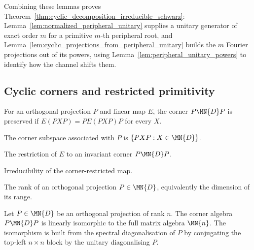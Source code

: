 Combining these lemmas proves Theorem~\ref{thm:cyclic_decomposition_irreducible_schwarz}:
Lemma~\ref{lem:normalized_peripheral_unitary} supplies a unitary generator of
exact order $m$ for a primitive $m$-th peripheral root, and
Lemma~\ref{lem:cyclic_projections_from_peripheral_unitary} builds the $m$
Fourier projections out of its powers, using
Lemma~\ref{lem:peripheral_unitary_powers} to identify how the channel shifts
them.

\subsection{Cyclic corners and restricted primitivity}

\begin{definition}
    \leanok
    For an orthogonal projection $P$ and linear map $E$, the corner
    $P\MN{D}P$ is preserved if $E(PXP)=PE(PXP)P$ for every $X$.
\end{definition}

\begin{definition}
    \leanok
    The corner subspace associated with $P$ is
    $\{PXP:X\in\MN{D}\}$.
\end{definition}

\begin{definition}
    \label{def:corner_restriction}
    \leanok
    The restriction of $E$ to an invariant corner $P\MN{D}P$.
\end{definition}

\begin{definition}
    \leanok
    Irreducibility of the corner-restricted map.
\end{definition}

\begin{definition}
    \leanok
    The rank of an orthogonal projection $P\in\MN{D}$, equivalently the
    dimension of its range.
\end{definition}

\begin{lemma}%
    \label{thm:compression_isometry_projection}
    \leanok
    Let $P\in\MN{D}$ be an orthogonal projection of rank $n$. The corner
    algebra $P\MN{D}P$ is linearly isomorphic to the full matrix algebra
    $\MN{n}$. The isomorphism is built from the spectral diagonalisation
    of $P$ by conjugating the top-left $n\times n$ block by the unitary
    diagonalising $P$.
\end{lemma}

